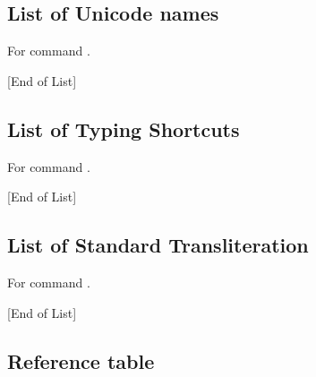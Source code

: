 \documentclass{article}
\newcommand\eolist{{\tiny [End of List]}\par}
\begin{document}
\subsection{List of Unicode names}
For command \codedetok{\avtransun{}}.
\begin{multicols}{4}\noindent
\avtag
\avshowplainlistun
\eolist
\end{multicols}

\subsection{List of Typing Shortcuts}
For command \codedetok{\avtransts{}}.
\begin{multicols}{4}\noindent
\avtag
\avshowplainlistts
\eolist
\end{multicols}

\subsection{List of Standard Transliteration}
For command \codedetok{\avtransst{}}.
\begin{multicols}{4}\noindent
\avtag
\avshowplainlistst
\eolist
\end{multicols}

\subsection{Reference table}
\end{document}
